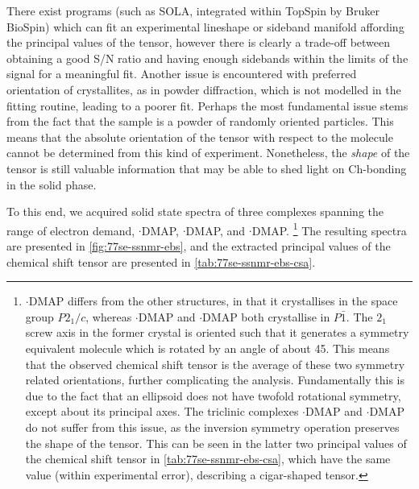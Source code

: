 \begin{refsection}
There exist programs (such as SOLA, integrated within TopSpin by Bruker BioSpin) which can fit an experimental lineshape or sideband manifold affording the principal values of the tensor, however there is clearly a trade-off between obtaining a good S/N ratio and having enough sidebands within the limits of the signal for a meaningful fit.
Another issue is encountered with preferred orientation of crystallites, as in powder diffraction, which is not modelled in the fitting routine, leading to a poorer fit.
Perhaps the most fundamental issue stems from the fact that the sample is a powder of randomly oriented particles.
This means that the absolute orientation of the tensor with respect to the molecule cannot be determined from this kind of experiment.
Nonetheless, the \emph{shape} of the tensor is still valuable information that may be able to shed light on Ch-bonding in the solid phase.

To this end, we acquired solid state spectra of three complexes spanning the range of electron demand, $\cdot$DMAP, $\cdot$DMAP, and $\cdot$DMAP.
\footnote{$\cdot$DMAP differs from the other structures, in that it crystallises in the space group $P2_1/c$, whereas $\cdot$DMAP and $\cdot$DMAP both crystallise in $P\bar{1}$.
The $2_1$ screw axis in the former crystal is oriented such that it generates a symmetry equivalent molecule which is rotated by an angle of about 45\degree.
This means that the observed chemical shift tensor is the average of these two symmetry related orientations, further complicating the analysis.
Fundamentally this is due to the fact that an ellipsoid does not have twofold rotational symmetry, except about its principal axes.
The triclinic complexes $\cdot$DMAP and $\cdot$DMAP do not suffer from this issue, as the inversion symmetry operation preserves the shape of the tensor.
This can be seen in the latter two principal values of the chemical shift tensor in \cref{tab:77se-ssnmr-ebs-csa}, which have the same value (within experimental error), describing a cigar-shaped tensor.}
The resulting spectra are presented in \cref{fig:77se-ssnmr-ebs}, and the extracted principal values of the chemical shift tensor are presented in \cref{tab:77se-ssnmr-ebs-csa}.


\end{refsection}
